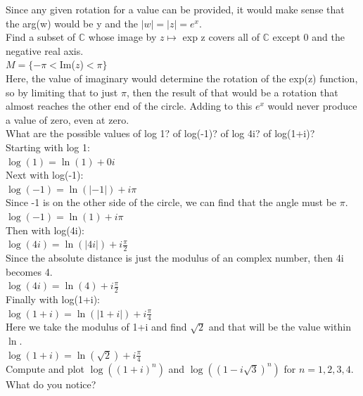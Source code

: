 \documentclass[12pt]{article}
\begin{document}
Since any given rotation for a value can be provided, it would make sense that the arg(w) would be y and the $|w| = |z| = e^x$.\\


 Find a subset of $\mathbb{C}$ whose image by $z \mapsto$ exp z covers all of $\mathbb{C}$ except 0 and the negative real axis.\\

$M = \{ -\pi < $Im($z$)$ < \pi\}$\\
Here, the value of imaginary would determine the rotation of the exp(z) function, so by limiting that to just $\pi$, then the result of that would be a rotation that almost reaches the other end of the circle.
Adding to this $e^x$ would never produce a value of zero, even at zero.\\


 What are the possible values of log 1? of log(-1)? of log 4i? of log(1+i)?\\

Starting with log 1:\\
$\log(1) = \ln(1) + 0i$\\

Next with log(-1):\\
$\log(-1) = \ln(|-1|) + i\pi$\\
Since -1 is on the other side of the circle, we can find that the angle must be $\pi$.\\
$\log(-1) = \ln(1) + i\pi$\\

Then with log(4i):\\
$\log(4i) = \ln(|4i|) + i\frac{\pi}{2}$\\
Since the absolute distance is just the modulus of an complex number, then 4i becomes 4.\\
$\log(4i) = \ln(4) + i\frac{\pi}{2}$\\


Finally with log(1+i):\\
$\log(1+i) = \ln(|1+i|) + i\frac{\pi}{4}$\\
Here we take the modulus of 1+i and find $\sqrt{2}$ and that will be the value within $\ln$.\\
$\log(1+i) = \ln(\sqrt{2}) + i\frac{\pi}{4}$\\


 Compute and plot $\log((1 + i)^n)$ and $\log((1-i\sqrt{3})^n)$ for $n = 1,2,3,4$.
What do you notice?\\
\end{document}
